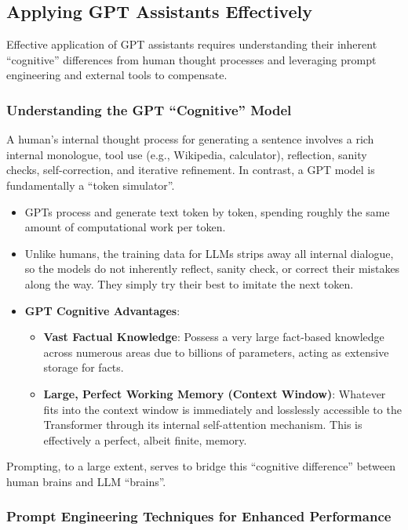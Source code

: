 \subsection{Applying GPT Assistants Effectively}

Effective application of GPT assistants requires understanding their inherent ``cognitive'' differences from human thought processes and leveraging prompt engineering and external tools to compensate.

\subsubsection{Understanding the GPT ``Cognitive'' Model}

A human's internal thought process for generating a sentence involves a rich internal monologue, tool use (e.g., Wikipedia, calculator), reflection, sanity checks, self-correction, and iterative refinement. In contrast, a GPT model is fundamentally a ``token simulator''.

\begin{itemize}
    \item GPTs process and generate text token by token, spending roughly the same amount of computational work per token.
    \item Unlike humans, the training data for LLMs strips away all internal dialogue, so the models do not inherently reflect, sanity check, or correct their mistakes along the way. They simply try their best to imitate the next token.
    \item \textbf{GPT Cognitive Advantages}:
        \begin{itemize}
            \item \textbf{Vast Factual Knowledge}: Possess a very large fact-based knowledge across numerous areas due to billions of parameters, acting as extensive storage for facts.
            \item \textbf{Large, Perfect Working Memory (Context Window)}: Whatever fits into the context window is immediately and losslessly accessible to the Transformer through its internal self-attention mechanism. This is effectively a perfect, albeit finite, memory.
        \end{itemize}
\end{itemize}

Prompting, to a large extent, serves to bridge this ``cognitive difference'' between human brains and LLM ``brains''.

\subsubsection{Prompt Engineering Techniques for Enhanced Performance}

